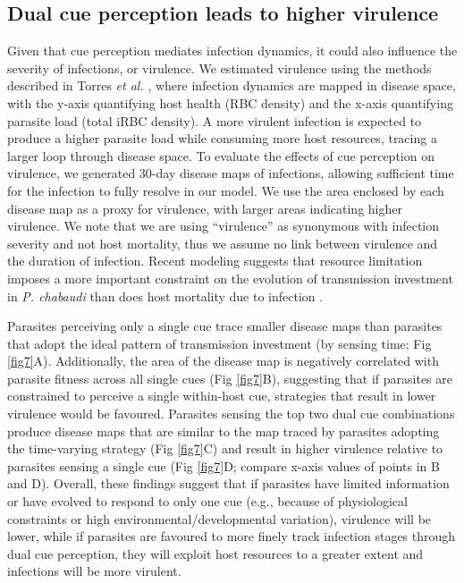 \documentclass[10pt,letterpaper]{article}
\begin{document}
\subsection*{Dual cue perception leads to higher virulence}
Given that cue perception mediates infection dynamics, it could also influence the severity of infections, or virulence. We estimated virulence using the methods described in Torres \emph{et al.} \cite{torres_tracking_2016}, where infection dynamics are mapped in disease space, with the y-axis quantifying host health (RBC density) and the x-axis quantifying parasite load (total iRBC density). A more virulent infection is expected to produce a higher parasite load while consuming more host resources, tracing a larger loop through disease space. To evaluate the effects of cue perception on virulence, we generated 30-day disease maps of infections, allowing sufficient time for the infection to fully resolve in our model. We use the area enclosed by each disease map as a proxy for virulence, with larger areas indicating higher virulence. We note that we are using ``virulence'' as synonymous with infection severity and not host mortality, thus we assume no link between virulence and the duration of infection. Recent modeling suggests that resource limitation imposes a more important constraint on the evolution of transmission investment in \textit{P. chabaudi} than does host mortality due to infection \cite{pak_proliferation_2024}.
\newline

Parasites perceiving only a single cue trace smaller disease maps than parasites that adopt the ideal pattern of transmission investment (by sensing time; Fig \ref{fig7}A). Additionally, the area of the disease map is negatively correlated with parasite fitness across all single cues (Fig \ref{fig7}B), suggesting that if parasites are constrained to perceive a single within-host cue, strategies that result in lower virulence would be favoured. Parasites sensing the top two dual cue combinations produce disease maps that are similar to the map traced by parasites adopting the time-varying strategy (Fig \ref{fig7}C) and result in higher virulence relative to parasites sensing a single cue (Fig \ref{fig7}D; compare x-axis values of points in B and D). Overall, these findings suggest that if parasites have limited information or have evolved to respond to only one cue (e.g., because of physiological constraints or high environmental/developmental variation), virulence will be lower, while if parasites are favoured to more finely track infection stages through dual cue perception, they will exploit host resources to a greater extent and infections will be more virulent.\newline
\end{document}
